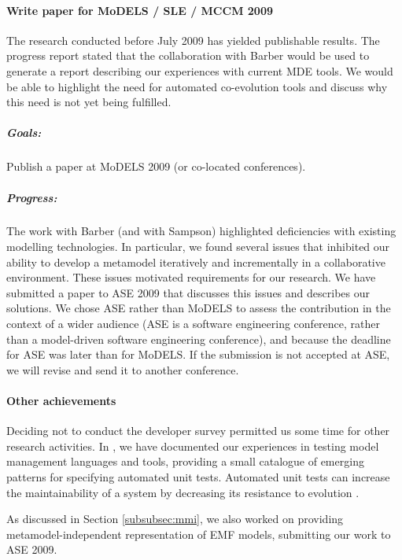 \paragraph{Write paper for MoDELS / SLE / MCCM 2009} %
\label{par:write_paper_for_models_sle_mccm_2009}
The research conducted before July 2009 has yielded publishable results. The progress report stated that the collaboration with Barber would be used to generate a report describing our experiences with current MDE tools. We would be able to highlight the need for automated co-evolution tools and discuss why this need is not yet being fulfilled.

\subparagraph{Goals:} Publish a paper at MoDELS 2009 (or co-located conferences).

\subparagraph{Progress:} The work with Barber (and with Sampson) highlighted deficiencies with existing modelling technologies. In particular, we found several issues that inhibited our ability to develop a metamodel iteratively and incrementally in a collaborative environment. These issues motivated requirements for our research. We have submitted a paper to ASE 2009 that discusses this issues and describes our solutions. We chose ASE rather than MoDELS to assess the contribution in the context of a wider audience (ASE is a software engineering conference, rather than a model-driven software engineering conference), and because the deadline for ASE was later than for MoDELS. If the submission is not accepted at ASE, we will revise and send it to another conference.



\paragraph{Other achievements}
Deciding not to conduct the developer survey permitted us some time for other research activities. In \cite{rose09patterns}, we have documented our experiences in testing model management languages and tools, providing a small catalogue of emerging patterns for specifying automated unit tests. Automated unit tests can increase the maintainability of a system by decreasing its resistance to evolution \cite{fowler99refactoring}.

As discussed in Section \ref{subsubsec:mmi}, we also worked on providing metamodel-independent representation of EMF models, submitting our work to ASE 2009.